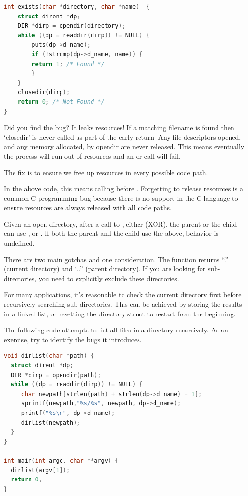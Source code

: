 \begin{lstlisting}[language=C]
int exists(char *directory, char *name)  {
    struct dirent *dp;
    DIR *dirp = opendir(directory);
    while ((dp = readdir(dirp)) != NULL) {
        puts(dp->d_name);
        if (!strcmp(dp->d_name, name)) {
        return 1; /* Found */
        }
    }
    closedir(dirp);
    return 0; /* Not Found */
}
\end{lstlisting}

Did you find the bug?
It leaks resources!
If a matching filename is found then `closedir' is never called as part of the early return.
Any file descriptors opened, and any memory allocated, by opendir are never released.
This means eventually the process will run out of resources and an  or  call will fail.

The fix is to ensure we free up resources in every possible code path.

In the above code, this means calling  before .
Forgetting to release resources is a common C programming bug because there is no support in the C language to ensure resources are always released with all code paths.


Given an open directory, after a call to , either (XOR), the parent or the child can use ,  or .
If both the parent and the child use the above, behavior is undefined.

There are two main gotchas and one consideration.
The  function returns ``.'' (current directory) and ``..'' (parent directory).
If you are looking for sub-directories, you need to explicitly exclude these directories.

For many applications, it's reasonable to check the current directory first before recursively searching sub-directories.
This can be achieved by storing the results in a linked list, or resetting the directory struct to restart from the beginning.

The following code attempts to list all files in a directory recursively.
As an exercise, try to identify the bugs it introduces.

\begin{lstlisting}[language=C]
void dirlist(char *path) {
  struct dirent *dp;
  DIR *dirp = opendir(path);
  while ((dp = readdir(dirp)) != NULL) {
     char newpath[strlen(path) + strlen(dp->d_name) + 1];
     sprintf(newpath,"%s/%s", newpath, dp->d_name);
     printf("%s\n", dp->d_name);
     dirlist(newpath);
  }
}

int main(int argc, char **argv) {
  dirlist(argv[1]);
  return 0;
}
\end{lstlisting}

